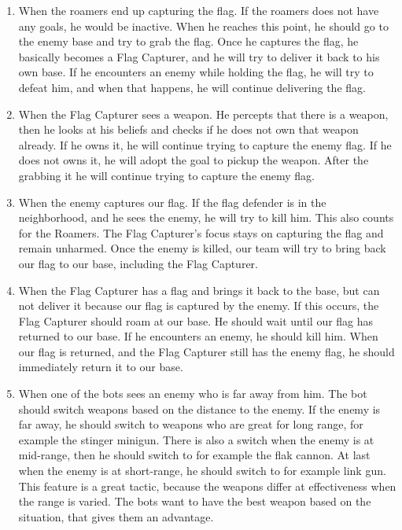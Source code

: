 \begin{enumerate}
	\item When the roamers end up capturing the flag. If the roamers does not have any goals, he would be inactive. When he reaches this point, he should go to the enemy base and try to grab the flag. Once he captures the flag, he basically becomes a Flag Capturer, and he will try to deliver it back to his own base. If he encounters an enemy while holding the flag, he will try to defeat him, and when that happens, he will continue delivering the flag.\\ 
	\item When the Flag Capturer sees a weapon. He percepts that there is a weapon, then he looks at his beliefs and checks if he does not own that weapon already. If he owns it, he will continue trying to capture the enemy flag. If he does not owns it, he will adopt the goal to pickup the weapon. After the grabbing it he will continue trying to capture the enemy flag.\\
	\item When the enemy captures our flag. If the flag defender is in the neighborhood, and he sees the enemy, he will try to kill him. This also counts for the Roamers. The Flag Capturer's focus stays on capturing the flag and remain unharmed. Once the enemy is killed, our team will try to bring back our flag to our base, including the Flag Capturer. \\
	\item When the Flag Capturer has a flag and brings it back to the base, but can not deliver it because our flag is captured by the enemy. If this occurs, the Flag Capturer should roam at our base. He should wait until our flag has returned to our base. If he encounters an enemy, he should kill him. When our flag is returned, and the Flag Capturer still has the enemy flag, he should immediately return it to our base.\\
	\item When one of the bots sees an enemy who is far away from him. The bot should switch weapons based on the distance to the enemy. If the enemy is far away, he should switch to weapons who are great for long range, for example the stinger minigun. There is also a switch when the enemy is at mid-range, then he should switch to for example the flak cannon. At last when the enemy is at short-range, he should switch to for example link gun. This feature is a great tactic, because the weapons differ at effectiveness when the range is varied. The bots want to have the best weapon based on the situation, that gives them an advantage. 
\end{enumerate}




